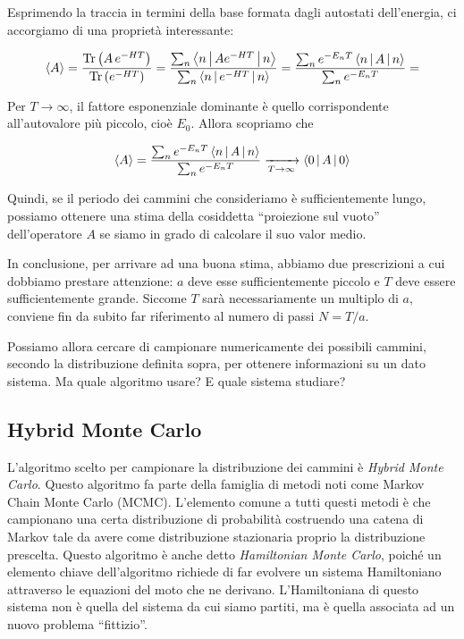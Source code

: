 \documentclass[11pt, a4paper]{article}
\DeclareMathOperator{\Tr}{Tr}
\begin{document}
Esprimendo la traccia in termini della base formata dagli autostati dell'energia, ci accorgiamo di una proprietà interessante:

\begin{equation}
  \left\langle A \right\rangle =
  \frac{\Tr\left(A \, e^{-HT}\right)}{\Tr\left(e^{-HT}\right)} =
  \frac{\sum_{n} \Braket{n | A e^{-H T} | n} }{\sum_{n} \Braket{n | e^{-H T} | n}} =
  \frac{\sum_{n} e^{-E_n T} \Braket{n | A | n}}{\sum_{n} e^{-E_n T}} =
\end{equation}

Per $T \to \infty$, il fattore esponenziale dominante è quello corrispondente all'autovalore più piccolo, cioè $E_0$. Allora scopriamo che

\begin{equation}
  \label{proj_void}
  \left\langle A \right\rangle =
  \frac{\sum_{n} e^{-E_n T} \Braket{n | A | n}}{\sum_{n} e^{-E_n T}} \xrightarrow[T \to \infty]{} \Braket{0 | A | 0}
\end{equation}

Quindi, se il periodo dei cammini che consideriamo è sufficientemente lungo, possiamo ottenere una stima della cosiddetta ``proiezione sul vuoto'' dell'operatore $A$
se siamo in grado di calcolare il suo valor medio.

In conclusione, per arrivare ad una buona stima, abbiamo due prescrizioni a cui dobbiamo prestare attenzione: $a$ deve esse sufficientemente piccolo e $T$ deve essere sufficientemente grande.
Siccome $T$ sarà necessariamente un multiplo di $a$, conviene fin da subito far riferimento al numero di passi $N = T / a$.

Possiamo allora cercare di campionare numericamente dei possibili cammini, secondo la distribuzione definita sopra, per ottenere informazioni su un dato sistema.
Ma quale algoritmo usare? E quale sistema studiare?


\subsection{Hybrid Monte Carlo}

L'algoritmo scelto per campionare la distribuzione dei cammini è \emph{Hybrid Monte Carlo}. Questo algoritmo fa parte della famiglia di metodi noti come Markov Chain Monte Carlo (MCMC).
L'elemento comune a tutti questi metodi è che campionano una certa distribuzione di probabilità costruendo una catena di Markov tale da avere come distribuzione stazionaria proprio la distribuzione prescelta.
Questo algoritmo è anche detto \emph{Hamiltonian Monte Carlo}, poiché un elemento chiave dell'algoritmo richiede di far evolvere un sistema Hamiltoniano attraverso le equazioni del moto che ne derivano.
L'Hamiltoniana di questo sistema non è quella del sistema da cui siamo partiti, ma è quella associata ad un nuovo problema ``fittizio''.
\end{document}
